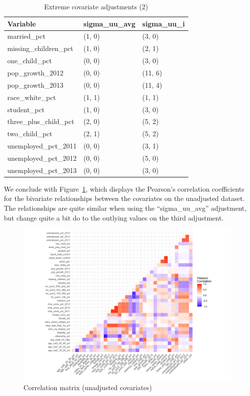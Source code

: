 \documentclass[12pt]{article}
\begin{document}
\begin{table}[ht]
\centering
\begin{tabular}{lll}
  \toprule
Variable & sigma\_uu\_avg & sigma\_uu\_i \\ 
  \midrule
  married\_pct & (1, 0) & (3, 0) \\ 
  missing\_children\_pct & (1, 0) & (2, 1) \\ 
  one\_child\_pct & (0, 0) & (3, 0) \\ 
  pop\_growth\_2012 & (0, 0) & (11, 6) \\ 
  pop\_growth\_2013 & (0, 0) & (11, 4) \\ 
  race\_white\_pct & (1, 1) & (1, 1) \\ 
  student\_pct & (1, 0) & (3, 0) \\ 
  three\_plus\_child\_pct & (2, 0) & (5, 2) \\ 
  two\_child\_pct & (2, 1) & (5, 2) \\ 
  unemployed\_pct\_2011 & (0, 0) & (3, 1) \\ 
  unemployed\_pct\_2012 & (0, 0) & (5, 0) \\ 
  unemployed\_pct\_2013 & (0, 0) & (3, 0) \\ 
   \bottomrule
\end{tabular}
    \caption{Extreme covariate adjustments (2)}
    \label{tab:extreme2}
\end{table}

We conclude with Figure~\ref{fig:corrmatrix}, which displays the Pearson's correlation coefficients for the bivariate relationships between the covariates on the unadjusted dataset. The relationships are quite similar when using the ``sigma\_uu\_avg'' adjustment, but change quite a bit do to the outlying values on the third adjustment.

\begin{figure}[]
\begin{center}
    \includegraphics[scale=0.6]{01_Plots/correlation-plot-c1-sigma-zero.png}
    \caption{Correlation matrix (unadjusted covariates)}
    \label{fig:corrmatrix}
\end{center}
\end{figure}
\end{document}
